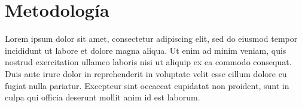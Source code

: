 
\chapter{Metodología}
\label{cha:metodologia}

\ifpdf
    \graphicspath{{4_metodologia/figures/PNG/}{4_metodologia/figures/PDF/}{4_metodologia/figures/}}
\else
    \graphicspath{{4_metodologia/figures/EPS/}{4_metodologia/figures/}}
\fi


Lorem ipsum dolor sit amet, consectetur adipiscing elit, sed do eiusmod tempor incididunt ut labore et dolore magna aliqua. Ut enim ad minim veniam, quis nostrud exercitation ullamco laboris nisi ut aliquip ex ea commodo consequat. Duis aute irure dolor in reprehenderit in voluptate velit esse cillum dolore eu fugiat nulla pariatur. Excepteur sint occaecat cupidatat non proident, sunt in culpa qui officia deserunt mollit anim id est laborum.





